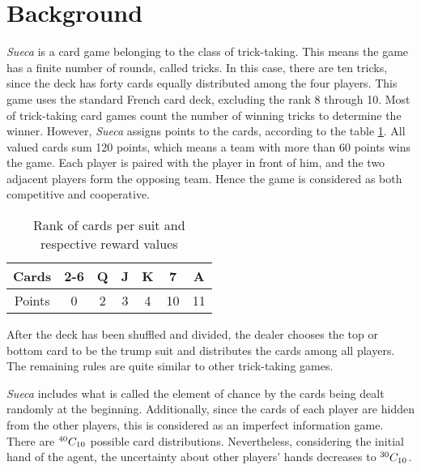 \section{Background} \label{background}

\emph{Sueca} is a card game belonging to the class of trick-taking. This means the game has a finite number of rounds, called tricks. In this case, there are ten tricks, since the deck has forty cards equally distributed among the four players. This game uses the standard French card deck, excluding the rank 8 through 10. Most of trick-taking card games count the number of winning tricks to determine the winner. However, \emph{Sueca} assigns points to the cards, according to the table \ref{points-table}. All valued cards sum 120 points, which means a team with more than 60 points wins the game. Each player is paired with the player in front of him, and the two adjacent players form the opposing team. Hence the game is considered as both competitive and cooperative.

\begin{table}[h]
\centering
\begin{tabular}{|c|c|c|c|c|c|c|}
\hline
Cards  & 2-6 & Q & J & K & 7  & A  \\ \hline
Points & 0   & 2 & 3 & 4 & 10 & 11 \\ \hline
\end{tabular}
\caption{Rank of cards per suit and respective reward values}
\label{points-table}
\end{table}

After the deck has been shuffled and divided, the dealer chooses the top or bottom card to be the trump suit and distributes the cards among all players. The remaining rules are quite similar to other trick-taking games.

\emph{Sueca} includes what is called the element of chance by the cards being dealt randomly at the beginning. Additionally, since the cards of each player are hidden from the other players, this is considered as an imperfect information game.
There are ${}^{40}C_{10}$ possible card distributions. Nevertheless, considering the initial hand of the agent, the uncertainty about other players' hands decreases to ${}^{30}C_{10}$.

